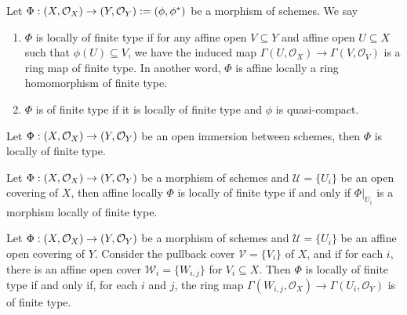 \begin{definition}
Let $\Phi : \left(X, \mathcal{O}_{X}\right) \to \left(Y, \mathcal{O}_{Y}\right) := (\phi, \phi^*)$ be a morphism of schemes. We say
\begin{enumerate}
    \item $\Phi$ is locally of finite type if for any affine open $V \subseteq Y$ and affine open $U \subseteq X$ such that $\phi(U) \subseteq V$, we have the induced map $\Gamma(U, \mathcal{O}_X) \to \Gamma(V, \mathcal{O}_V)$ is a ring map of finite type. In another word, $\Phi$ is affine locally a ring homomorphism of finite type.
    \item $\Phi$ is of finite type if it is locally of finite type and $\phi$ is quasi-compact.
\end{enumerate}
\end{definition}

\begin{proposition}\label{thm:affine-locally-open-immersion}
  Let $\Phi : \left(X, \mathcal{O}_{X}\right) \to \left(Y, \mathcal{O}_{Y}\right)$ be an open immersion between schemes, then $\Phi$ is locally of finite type.
\end{proposition}

\begin{proposition}\label{thm:affine-locally-source-cover}
  Let $\Phi : \left(X, \mathcal{O}_{X}\right) \to \left(Y, \mathcal{O}_{Y}\right)$ be a morphism of schemes and $\mathcal{U} = \{U_{i}\}$ be an open covering of $X$, then affine locally $\Phi$ is locally of finite type if and only if $\Phi|_{U_i}$ is a morphism locally of finite type.
\end{proposition}

\begin{proposition}\label{thm:affine-cover-locally-of-finite-type}
  Let $\Phi : \left(X, \mathcal{O}_{X}\right) \to \left(Y, \mathcal{O}_{Y}\right)$ be a morphism of schemes and $\mathcal{U}=\{U_{i}\}$ be an affine open covering of $Y$. Consider the pullback cover $\mathcal{V} = \{V_{i}\}$ of $X$, and if for each $i$, there is
  an affine open cover $\mathcal{W}_{i} = \{W_{i, j}\}$ for $V_{i} \subseteq X$. Then $\Phi$ is locally of finite type if and only if, for each $i$ and $j$, the ring map
  $\Gamma(W_{i, j}, \mathcal{O}_{X}) \to \Gamma(U_{i}, \mathcal{O}_{Y})$ is of finite type.
\end{proposition}

